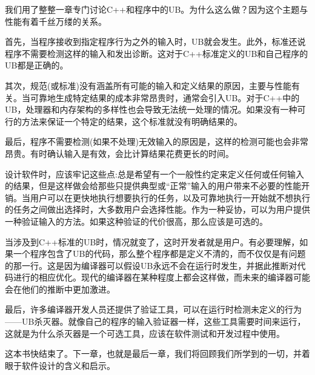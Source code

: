 我们用了整整一章专门讨论C++和程序中的UB。为什么这么做？因为这个主题与性能有着千丝万缕的关系。

首先，当程序接收到指定程序行为之外的输入时，UB就会发生。此外，标准还说程序不需要检测这样的输入和发出诊断。这对于C++标准定义的UB和自己程序的UB都是正确的。

其次，规范(或标准)没有涵盖所有可能的输入和定义结果的原因，主要与性能有关。当可靠地生成特定结果的成本非常昂贵时，通常会引入UB。对于C++中的UB，处理器和内存架构的多样性也会导致无法统一处理的情况。如果没有一种可行的方法来保证一个特定的结果，这个标准就没有明确结果的。

最后，程序不需要检测(如果不处理)无效输入的原因是，这样的检测可能也会非常昂贵。有时确认输入是有效，会比计算结果花费更长的时间。

设计软件时，应该牢记这些点:总是希望有一个一般性约定来定义任何或任何输入的结果，但是这样做会给那些只提供典型或“正常”输入的用户带来不必要的性能开销。当用户可以在更快地执行想要执行的任务，以及可靠地执行一开始就不想执行的任务之间做出选择时，大多数用户会选择性能。作为一种妥协，可以为用户提供一种验证输入的方法。如果这种验证的代价很高，那么应该是可选的。

当涉及到C++标准的UB时，情况就变了，这时开发者就是用户。有必要理解，如果一个程序包含了UB的代码，那么整个程序都是定义不清的，而不仅仅是有问题的那一行。这是因为编译器可以假设UB永远不会在运行时发生，并据此推断对代码进行的相应优化。现代的编译器在某种程度上都会这样做，而未来的编译器可能会在他们的推断中更加激进。 

最后，许多编译器开发人员还提供了验证工具，可以在运行时检测未定义的行为——UB杀灭器。就像自己的程序的输入验证器一样，这些工具需要时间来运行，这就是为什么杀灭器是一个可选工具，应该在软件测试和开发过程中使用。

这本书快结束了。下一章，也就是最后一章，我们将回顾我们所学到的一切，并着眼于软件设计的含义和启示。
